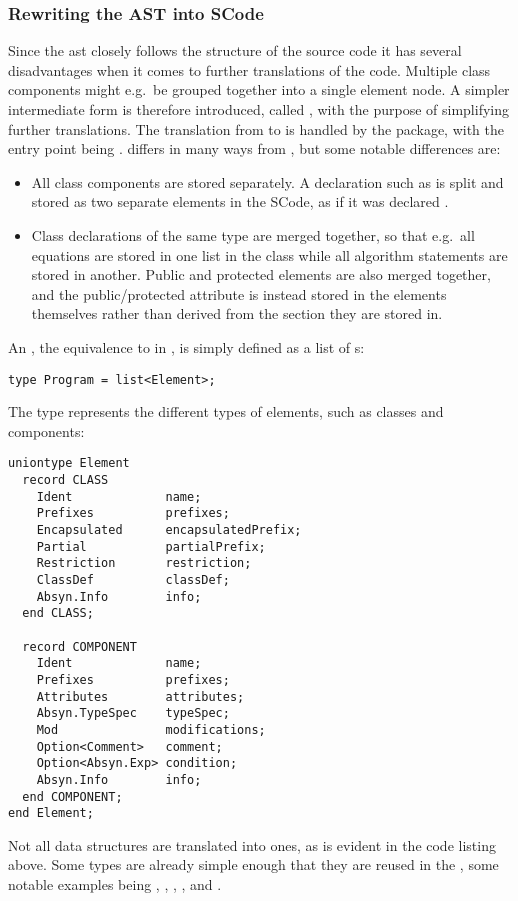 \subsubsection{Rewriting the AST into SCode}
Since the \gls{ast} closely follows the structure of the source code it has
several disadvantages when it comes to further translations of the code.
Multiple class components might e.g.\ be grouped together into a single element
node. A simpler intermediate form is therefore introduced, called
, with the purpose of simplifying further translations. The
translation from  to  is handled by the
 package, with the entry point being
.
 differs in many ways from , but some notable
differences are:
\begin{itemize}
\item All class components are stored separately. A declaration such as
       is split and stored as two separate elements
      in the SCode, as if it was declared .

\item Class declarations of the same type are merged together, so that e.g.\ all
      equations are stored in one list in the class while all algorithm
      statements are stored in another. Public and protected elements are also
      merged together, and the public/protected attribute is instead stored in
      the elements themselves rather than derived from the section they are
      stored in.
\end{itemize}
An , the equivalence to  in
, is simply defined as a list of s:
\begin{lstlisting}[language=modelica]
type Program = list<Element>;
\end{lstlisting}
The  type represents the different types of elements, such
as classes and components:
\begin{lstlisting}[language=modelica]
uniontype Element
  record CLASS
    Ident             name;
    Prefixes          prefixes;
    Encapsulated      encapsulatedPrefix;
    Partial           partialPrefix;
    Restriction       restriction;
    ClassDef          classDef;
    Absyn.Info        info;
  end CLASS;

  record COMPONENT
    Ident             name;
    Prefixes          prefixes;
    Attributes        attributes;
    Absyn.TypeSpec    typeSpec;
    Mod               modifications;
    Option<Comment>   comment;
    Option<Absyn.Exp> condition;
    Absyn.Info        info;
  end COMPONENT;
end Element;
\end{lstlisting}
Not all  data structures are translated into 
ones, as is evident in the code listing above. Some types are already simple
enough that they are reused in the , some notable examples being
, , ,
, and .

